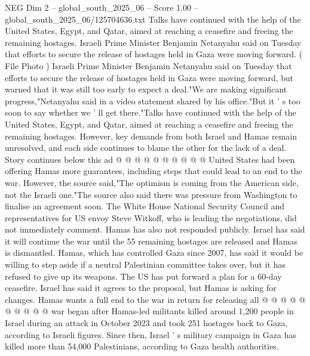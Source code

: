 \begin{textsample}{NEG Dim 2 – global\_south\_2025\_06 – Score 1.00 – global\_south\_2025\_06/125704636.txt}  \label{ex:f2_neg_365}
Talks have continued with the help of the United States, Egypt, and Qatar, aimed at reaching a ceasefire and freeing the remaining hostages.
Israeli Prime Minister Benjamin Netanyahu said on Tuesday that efforts to secure the release of hostages held in Gaza were moving forward. ( File Photo ) Israeli Prime Minister Benjamin Netanyahu said on Tuesday that efforts to secure the release of hostages held in Gaza were moving forward, but warned that it was still too early to expect a deal."We are making significant progress,"Netanyahu said in a video statement shared by his office."But it ' s too soon to say whether we ' ll get there."Talks have continued with the help of the United States, Egypt, and Qatar, aimed at reaching a ceasefire and freeing the remaining hostages.
However, key demands from both Israel and Hamas remain unresolved, and each side continues to blame the other for the lack of a deal.
Story continues below this ad @ @ @ @ @ @ @ @ @ @ United States had been offering Hamas more guarantees, including steps that could lead to an end to the war.
However, the source said,"The optimism is coming from the American side, not the Israeli one."The source also said there was pressure from Washington to finalise an agreement soon.
The White House National Security Council and representatives for US envoy Steve Witkoff, who is leading the negotiations, did not immediately comment.
Hamas has also not responded publicly.
Israel has said it will continue the war until the 55 remaining hostages are released and Hamas is dismantled.
Hamas, which has controlled Gaza since 2007, has said it would be willing to step aside if a neutral Palestinian committee takes over, but it has refused to give up its weapons.
The US has put forward a plan for a 60-day ceasefire.
Israel has said it agrees to the proposal, but Hamas is asking for changes.
Hamas wants a full end to the war in return for releasing all @ @ @ @ @ @ @ @ @ @ war began after Hamas-led militants killed around 1,200 people in Israel during an attack in October 2023 and took 251 hostages back to Gaza, according to Israeli figures.
Since then, Israel ' s military campaign in Gaza has killed more than 54,000 Palestinians, according to Gaza health authorities.

\end{textsample}
